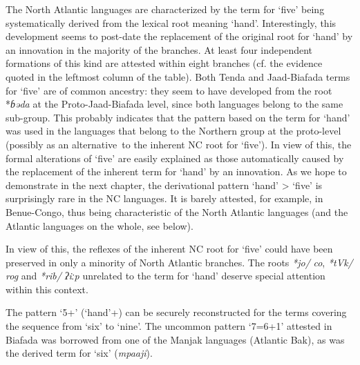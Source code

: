 The North Atlantic languages are characterized by the term for ‘five’ being systematically derived from the lexical root meaning ‘hand’. Interestingly, this development seems to post-date the replacement of the original root for ‘hand’ by an innovation in the majority of the branches. At least four independent formations of this kind are attested within eight branches (cf. the evidence quoted in the leftmost column of the table). Both Tenda and Jaad-Biafada terms for ‘five’ are of common ancestry: they seem to have developed from the root *\textit{ɓəda} at the Proto-Jaad-Biafada level, since both languages belong to the same sub-group. This probably indicates that the pattern based on the term for ‘hand’ was used in the languages that belong to the Northern group at the proto-level (possibly as an alternative~to the inherent NC root for ‘five’). In view of this, the formal alterations of ‘five’ are easily explained as those automatically caused by the replacement of the inherent term for ‘hand’ by an innovation. As we hope to demonstrate in the next chapter, the derivational pattern ‘hand’ > ‘five’ is surprisingly rare in the NC languages. It is barely attested, for example, in Benue-Congo, thus being characteristic of the North Atlantic languages (and the Atlantic languages on the whole, see below). 

In view of this, the reflexes of the inherent NC root for ‘five’ could have been preserved in only a minority of North Atlantic branches. The roots \textit{*jo/} \textit{co}, \textit{*tVk/} \textit{rog} and \textit{*rib/} \textit{ʔiːp} unrelated to the term for ‘hand’ deserve special attention within this context.

The pattern ‘5+’ (‘hand’+) can be securely reconstructed for the terms covering the sequence from ‘six’ to ‘nine’. The uncommon pattern ‘7=6+1’ attested in Biafada was borrowed from one of the Manjak languages (Atlantic Bak), as was the derived term for ‘six’ (\textit{mpaaji}).

\newpage 
{}

